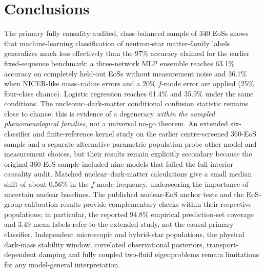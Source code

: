 \documentclass[11pt,a4paper]{article}
\begin{document}
\section{Conclusions}
The primary fully causality-audited, class-balanced sample of 340 EoSs shows that machine-learning classification of neutron-star matter-family labels generalizes much less effectively than the 97\% accuracy claimed for the earlier fixed-sequence benchmark: a three-network MLP ensemble reaches 63.1\% accuracy on completely held-out EoSs without measurement noise and 36.7\% when NICER-like mass--radius errors and a 20\% $f$-mode error are applied (25\% four-class chance). Logistic regression reaches 61.4\% and 35.9\% under the same conditions. The nucleonic--dark-matter conditional confusion statistic remains close to chance; this is evidence of a degeneracy \emph{within the sampled phenomenological families}, not a universal no-go theorem. An extended six-classifier and finite-reference kernel study on the earlier centre-screened 360-EoS sample and a separate alternative parametric population probe other model and measurement choices, but their results remain explicitly secondary because the original 360-EoS sample included nine models that failed the full-interior causality audit. Matched nuclear--dark-matter calculations give a small median shift of about 0.56\% in the $f$-mode frequency, underscoring the importance of uncertain nuclear baselines. The published nuclear-EoS anchor tests and the EoS-group calibration results provide complementary checks within their respective populations; in particular, the reported 94.8\% empirical prediction-set coverage and 3.49 mean labels refer to the extended study, not the causal-primary classifier. Independent microscopic and hybrid-star populations, the physical dark-mass stability window, correlated observational posteriors, transport-dependent damping and fully coupled two-fluid eigenproblems remain limitations for any model-general interpretation.
\end{document}
